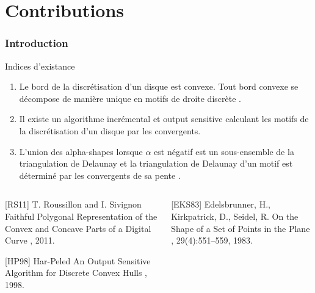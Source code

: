 \section{Contributions}


\begin{frame}
\frametitle{Introduction}
\begin{block}{Indices d'existance}

\begin{enumerate}
\item Le bord de la discrétisation d'un disque est convexe. Tout bord convexe se décompose de manière unique en motifs de droite discrète \cite{roussillonPR2011}. 
\item Il existe un algorithme incrémental et output sensitive calculant les motifs de la discrétisation d'un disque par les convergents. \cite{HarPeled98}
\item L'union des alpha-shapes lorsque $\alpha$ est négatif est un sous-ensemble de la triangulation de Delaunay \cite{EdeKirSei83}et la triangulation de Delaunay d'un motif est déterminé par les convergents de sa pente \cite{RoussillonL11}. 
\end{enumerate}

\end{block}

\begin{columns}[t]
  \begin{column}{0.5\linewidth}
    \scriptsize  
    \begin{thebibliography}{alpha}
      [RS11] T. Roussillon and I. Sivignon
      \newblock Faithful Polygonal Representation of the Convex and Concave Parts of a Digital Curve
      , 2011.
      
      [HP98] Har-Peled
      \newblock An Output Sensitive Algorithm for Discrete Convex Hulls
      , 1998.  
    \end{thebibliography}
    \scriptsize
  \end{column}
  \begin{column}{0.5\linewidth}
    \scriptsize
    \begin{thebibliography}{alpha}
      [EKS83] Edelsbrunner, H., Kirkpatrick, D., Seidel, R.
      \newblock On the Shape of a Set of Points in the Plane
      , 29(4):551--559, 1983.
      

\end{thebibliography}
\end{column}
\end{columns}
\end{frame}

